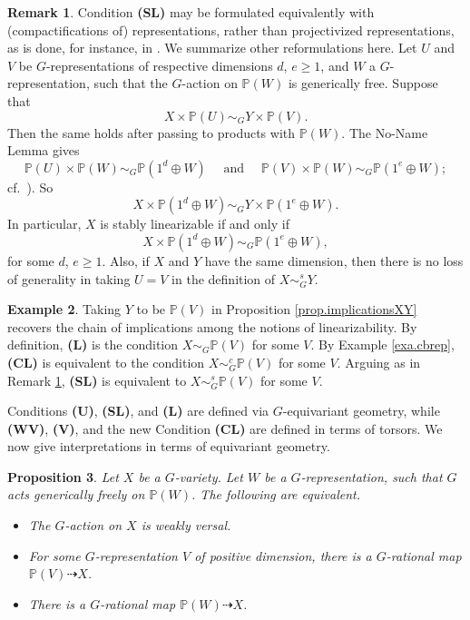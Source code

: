 \documentclass[12pt, reqno]{amsart}
\numberwithin{equation}{section}
\theoremstyle{plain}
\newtheorem{prop}{Proposition}[section]
\theoremstyle{definition}
\newtheorem{exam}[prop]{Example}
\newtheorem{rema}[prop]{Remark}
\def\bP{{\mathbb P}}
\begin{document}
\begin{rema}
\label{rem.SL}
Condition \textbf{(SL)} may be formulated equivalently with (compactifications of) representations, rather than projectivized representations, as is done, for instance, in \cite[Sect.\ 1]{DR}.
We summarize other reformulations here.
Let $U$ and $V$ be $G$-representations of respective dimensions $d$, $e\ge 1$, and $W$ a $G$-representation, such that the $G$-action on $\bP(W)$ is generically free.
Suppose that
$$
X\times \bP(U)\sim_G Y\times \bP(V).
$$
Then the same holds after passing to products with $\bP(W)$.
The No-Name Lemma gives 
$$
\bP(U)\times \bP(W)\sim_G \bP(1^d\oplus W) \quad \text{  and } \quad 
\bP(V)\times \bP(W)\sim_G \bP(1^e\oplus W);
$$
cf.\ \cite[Cor.\ 3.3]{KTsurvey}).
So
$$
X\times \bP(1^d\oplus W)\sim_G Y\times \bP(1^e\oplus W).
$$
In particular, $X$ is stably linearizable if and only if 
$$
X\times \bP(1^d\oplus W)\sim_G \bP(1^e\oplus W),
$$
for some $d$, $e\ge 1$.
Also, if $X$ and $Y$ have the same dimension, then there is no loss of generality in taking $U=V$ in the definition of $X\sim_G^sY$.
\end{rema}

\begin{exam}
\label{exa.implicationsXPV}
Taking $Y$ to be $\bP(V)$ in Proposition \ref{prop.implicationsXY} recovers the chain of implications among the notions of linearizability.
By definition, \textbf{(L)} is the condition $X\sim_G\bP(V)$ for some $V$.
By Example \ref{exa.cbrep}, \textbf{(CL)} is equivalent to the condition $X\sim_G^c \bP(V)$ for some $V$.
Arguing as in Remark \ref{rem.SL},
\textbf{(SL)} is equivalent to $X\sim_G^s\bP(V)$ for some $V$.
\end{exam}


Conditions \textbf{(U)}, \textbf{(SL)}, and \textbf{(L)} are defined via $G$-equivariant geometry, while
\textbf{(WV)}, \textbf{(V)}, and the new Condition \textbf{(CL)} are defined in terms of torsors. We now give interpretations in terms of equivariant geometry.

\begin{prop}
\label{prop.WV}
Let $X$ be a $G$-variety.
Let $W$ be a $G$-representation, such that $G$ acts generically freely on $\bP(W)$.
The following are equivalent.
\begin{itemize}
\item[(i)] The $G$-action on $X$ is weakly versal.
\item[(ii)] For some $G$-representation $V$ of positive dimension, there is a $G$-rational map $\bP(V)\dashrightarrow X$.
\item[(iii)] There is a $G$-rational map $\bP(W)\dashrightarrow X$.
\end{itemize}
\end{prop}
\end{document}
